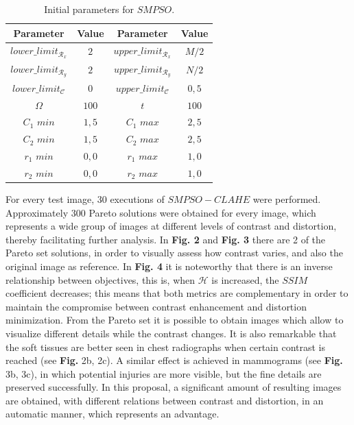 \documentclass[spanish,twocolumn]{article}
\begin{document}
{\begin{table}[h]
\begin{center}
 \begin{tabular}{||c c | c c||} 
 \hline
 Parameter & Value & Parameter & Value \\ [0.5ex] 
 \hline\hline
 $lower\_limit_{\mathscr{R}_x}$ & $2$ & $upper\_limit_{\mathscr{R}_x}$ & $M/2$ \\ 
 \hline
 $lower\_limit_{\mathscr{R}_y}$ & $2$ & $upper\_limit_{\mathscr{R}_y}$ & $N/2$ \\  
 \hline
 $lower\_limit_{{\mathscr{C}}}$ & $0$ & $upper\_limit_{{\mathscr{C}}}$ & $0,5$ \\
\hline
$\Omega$ & $100$ & $t$ & $100$ \\ 
\hline
$C_1$ $min$ & $1,5$ & $C_1$ $max$ & $2,5$ \\ 
\hline
$C_2$ $min$ & $1,5$ & $C_2$ $max$ & $2,5$ \\ 
\hline
$r_1$ $min$ & $0,0$ & $r_1$ $max$ & $1,0$ \\ 
\hline
$r_2$ $min$ & $0,0$ & $r_2$ $max$ & $1,0$ \\ [1ex]
\hline
\end{tabular}
\end{center}
\caption[Parámetros de entrada para $SMPSO$]{Initial parameters for $SMPSO$.}
\label{table:parametrospso}
\end{table}
 
 For every test image, 30 executions of $SMPSO-CLAHE$ were performed. Approximately 300 Pareto solutions were obtained for every image, which represents a wide group of images at different levels of contrast and distortion, thereby facilitating further analysis. In \textbf {Fig. 2}  and \textbf {Fig. 3} there are 2 of the Pareto set solutions, in order to visually assess how contrast varies, and also the original image as reference. In \textbf {Fig. 4} it is noteworthy that there is an inverse relationship between objectives, this is, when $\mathscr{H}$ is increased, the $SSIM$ coefficient decreases; this means that both metrics are complementary in order to maintain the compromise between contrast enhancement and distortion minimization. From the Pareto set it is possible to obtain images which allow to visualize different details while the contrast changes. It is also remarkable that the soft tissues are better seen in chest radiographs when certain contrast is reached (see \textbf {Fig.} 2b, 2c). A similar effect is achieved in mammograms (see \textbf {Fig.} 3b, 3c), in which potential injuries are more visible, but the fine details are preserved successfully. In this proposal, a significant amount of resulting images are obtained, with different relations between contrast and distortion, in an automatic manner, which represents an advantage.


}
\end{document}
